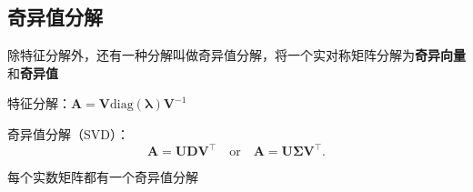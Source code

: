 \subsection{奇异值分解}%
\label{sub:奇异值分解}
除特征分解外，还有一种分解叫做奇异值分解，将一个实对称矩阵分解为\textbf{奇异向量}和\textbf{奇异值}
\begin{notation}
    特征分解：$\bm{A}=\bm{V}\mathrm{diag}(\bm{\lambda})\bm{V}^{-1}$
\end{notation}
\begin{defi}
    奇异值分解（SVD）：\[
        \bm{A}=\bm{UDV}^\top \quad \text{or} \quad \bm{A}=\bm{U\Sigma V}^\top 
    .\]
\end{defi}
\begin{notation}
    每个实数矩阵都有一个奇异值分解
\end{notation}
